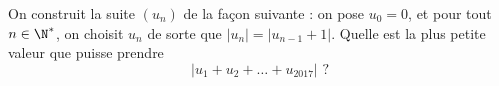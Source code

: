 On construit la suite $(u_n)$ de la façon suivante : on pose $u_0=0$, et pour tout $n\in \N^*$, on choisit $u_n$ de sorte que $\vert u_n\vert = \vert u_{n-1}+1\vert$. Quelle est la plus petite valeur que puisse prendre
$$\vert u_1+u_2+\dots+u_{2017}\vert \, \, ?$$